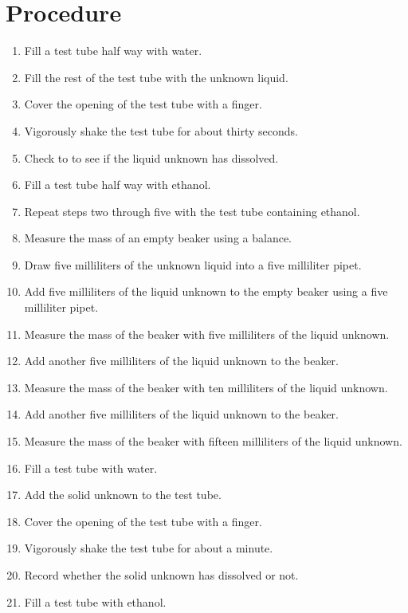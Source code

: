 \documentclass[12pt]{article}
\begin{document}
    \section*{Procedure}
        \begin{enumerate}
            \item Fill a test tube half way with water.
            \item Fill the rest of the test tube with the unknown liquid.
            \item Cover the opening of the test tube with a finger.
            \item Vigorously shake the test tube for about thirty seconds.
            \item Check to to see if the liquid unknown has dissolved.
            \item Fill a test tube half way with ethanol.
            \item Repeat steps two through five with the test tube containing ethanol.
            \item Measure the mass of an empty beaker using a balance.
            \item Draw five milliliters of the unknown liquid into a five milliliter pipet.
            \item Add five milliliters of the liquid unknown to the empty beaker using a five milliliter pipet.
            \item Measure the mass of the beaker with five milliliters of the liquid unknown.
            \item Add another five milliliters of the liquid unknown to the beaker.
            \item Measure the mass of the beaker with ten milliliters of the liquid unknown.
            \item Add another five milliliters of the liquid unknown to the beaker.
            \item Measure the mass of the beaker with fifteen milliliters of the liquid unknown.
            \item Fill a test tube with water.
            \item Add the solid unknown to the test tube.
            \item Cover the opening of the test tube with a finger.
            \item Vigorously shake the test tube for about a minute.
            \item Record whether the solid unknown has dissolved or not.
            \item Fill a test tube with ethanol.

\end{enumerate}
\end{document}
